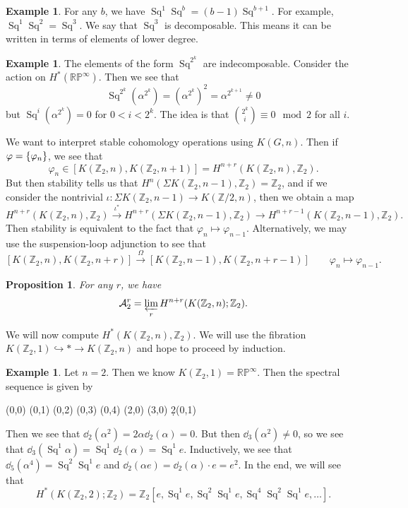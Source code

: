 \documentclass[leqno, openany]{memoir}
\newtheorem{prop}[thm]{Proposition}
\theoremstyle{definition}
\newtheorem{exm}[thm]{Example}
\theoremstyle{remark}
\theoremstyle{plain}
\theoremstyle{definition}
\theoremstyle{remark}
\newcommand{\R}{\mathbb{R}}
\newcommand{\Z}{\mathbb{Z}}
\renewcommand{\P}{\mathbb{P}}
\newcommand{\mc}[1]{\mathcal{#1}}
\DeclareMathOperator{\Sq}{Sq}
\begin{document}
\begin{exm}
    For any $b$, we have $\Sq^1 \Sq^b = (b-1) \Sq^{b+1}$. For example, $\Sq^1 \Sq^2 = \Sq^3$. We say that $\Sq^3$ is decomposable. This means it can be written in terms of elements of lower degree.
\end{exm}

\begin{exm}
    The elements of the form $\Sq^{2^k}$ are indecomposable. Consider the action on $H^*(\R\P^{\infty})$. Then we see that
    \[ \Sq^{2^k}(\alpha^{2^k}) = {(\alpha^{2^k})}^2 = \alpha^{2^{k+1}} \neq 0 \]
    but $\Sq^i (\alpha^{2^k})=  0$ for $0 < i < 2^k$. The idea is that $\binom{2^k}{i} \equiv 0 \mod 2$ for all $i$.
\end{exm}

We want to interpret stable cohomology operations using $K(G, n)$. Then if $\varphi = \qty{\varphi_n}$, we see that
\[ \varphi_n \in [K(\Z_2, n),K(\Z_2, n+1)] = H^{n+r}(K(\Z_2, n), \Z_2). \]
But then stability tells us that $H^n(\Sigma K(\Z_2, n-1), \Z_2) = \Z_2$, and if we consider the nontrivial $\iota \colon \Sigma K(\Z_2, n-1) \to K(\Z/2, n)$, then we obtain a map
\[ H^{n+r}(K(\Z_2, n), \Z_2) \xrightarrow{\iota^*} H^{n+r}(\Sigma K(\Z_2, n-1), \Z_2) \to H^{n+r-1}(K(\Z_2, n-1), \Z_2). \]
Then stability is equivalent to the fact that $\varphi_n \mapsto \varphi_{n-1}$. Alternatively, we may use the suspension-loop adjunction to see that
\[ [K(\Z_2, n), K(\Z_2, n+r)] \xrightarrow{\Omega} [K(\Z_2, n-1), K(\Z_2, n+r-1)] \qquad \varphi_n \mapsto \varphi_{n-1}. \]

\begin{prop}
    For any $r$, we have 
    \[ \mc{A}_2^r = \varprojlim_{r} H^{n+r}(K(\Z_2, n); \Z_2). \]
\end{prop}

We will now compute $H^*(K(\Z_2, n), \Z_2)$. We will use the fibration $K(\Z_2, 1) \hookrightarrow * \to K(\Z_2, n)$ and hope to proceed by induction.

\begin{exm}
    Let $n = 2$. Then we know $K(\Z_2, 1) = \R \P^{\infty}$. Then the spectral sequence is given by
    \begin{center}
        \begin{sseqdata}[classes={draw=none}, name=kz22, cohomological Serre grading]
            \class["1"](0,0)
            \class["\alpha"](0,1)
            \class["\alpha^2"](0,2)
            \class["\alpha^3"](0,3)
            \class["\alpha^2"](0,4)
            \class["e"](2,0)
            \class["\Sq^1 e"](3,0)
            \d2(0,1)
        \end{sseqdata}
        \printpage[name=kz22, page=2, grid=chess]
    \end{center}
    Then we see that $\dd_2(\alpha^2) = 2 \alpha \dd_2(\alpha) = 0$. But then $\dd_3(\alpha^2) \neq 0$, so we see that $\dd_3(\Sq^1 \alpha) = \Sq^1 \dd_2(\alpha) = \Sq^1 e$. Inductively, we see that $\dd_5(\alpha^4) = \Sq^2 \Sq^1 e$ and $\dd_2(\alpha e) = \dd_2 (\alpha) \cdot e = e^2$. In the end, we will see that
    \[ H^*(K(\Z_2, 2); \Z_2) = \Z_2 [ e, \Sq^1 e, \Sq^2 \Sq^1 e, \Sq^4 \Sq^2 \Sq^1 e, \ldots ]. \]
\end{exm}
\end{document}
